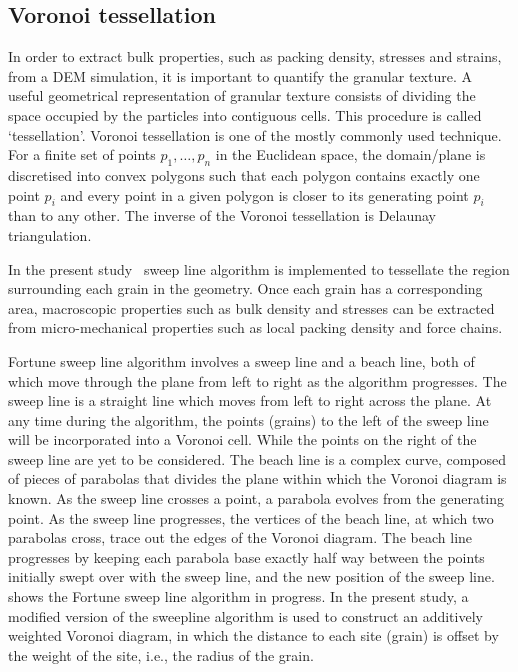 \subsection{Voronoi tessellation}

In order to extract bulk properties, such as packing density, stresses and 
strains, from a DEM simulation, it is important to quantify the granular 
texture. A useful geometrical representation of granular texture consists of 
dividing the space occupied by the particles into contiguous cells. This 
procedure is called `tessellation'. Voronoi tessellation is one of the mostly 
commonly used technique. For a finite set of points $p_1, \dots, p_n$ in the 
Euclidean space, the domain/plane is discretised into convex polygons such that 
each polygon contains exactly one point $p_i$ and every point in a given 
polygon is closer to its generating point $p_i$ than to any other. The inverse 
of the Voronoi tessellation is Delaunay triangulation.

In the present study~\citet{Fortune1992} sweep line algorithm is implemented to 
tessellate the region surrounding each grain in the geometry. Once each grain 
has a corresponding area, macroscopic properties such as bulk density and 
stresses can be extracted from micro-mechanical properties such as local 
packing density and force chains.

Fortune sweep line algorithm involves a sweep line and a beach line, both of 
which move through the plane from left to right as the algorithm progresses. 
The sweep line is a straight line which moves from left to right across the 
plane. At any time during the algorithm, the points (grains) to the left of the 
sweep line will be incorporated into a Voronoi cell. While the points on the 
right of the sweep line are yet to be considered. The beach line is a complex 
curve, composed of pieces of parabolas that divides the plane within which the 
Voronoi diagram is known. As the sweep line crosses a point, a parabola 
evolves from the generating point. As the sweep line progresses, the 
vertices of the beach line, at which two parabolas cross, trace out the edges 
of the Voronoi diagram. The beach line progresses by keeping each parabola base 
exactly half way between the points initially swept over with the sweep line, 
and the new position of the sweep line.~ shows the Fortune 
sweep line algorithm in progress. In the present study, a modified version of 
the sweepline algorithm is used to construct an additively weighted Voronoi 
diagram, in which the distance to each site (grain) is offset by the weight of 
the site, i.e., the radius of the grain.

